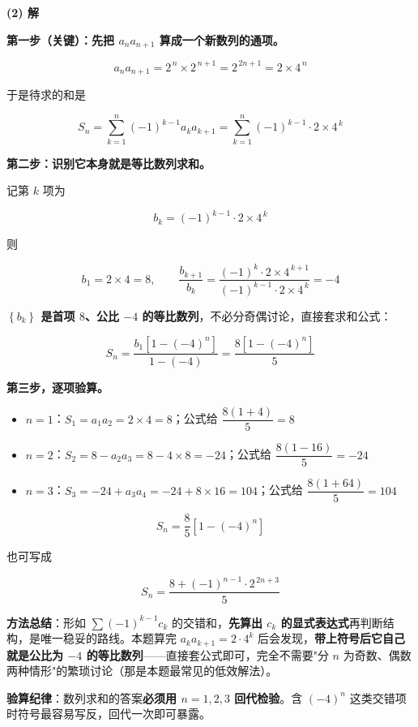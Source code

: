 \begin{answer}
\textbf{(2) 解}

\textbf{第一步（关键）：先把 $a_na_{n+1}$ 算成一个新数列的通项。}

\nopagebreak[4]
\[a_na_{n+1}=2^{\,n}\times2^{\,n+1}=2^{\,2n+1}=2\times4^{\,n}\]

于是待求的和是

\nopagebreak[4]
\[S_n=\sum_{k=1}^{n}(-1)^{k-1}a_ka_{k+1}=\sum_{k=1}^{n}(-1)^{k-1}\cdot2\times4^{\,k}\]

\textbf{第二步：识别它本身就是等比数列求和。}

记第 $k$ 项为

\nopagebreak[4]
\[b_k=(-1)^{k-1}\cdot2\times4^{\,k}\]

则

\nopagebreak[4]
\[b_1=2\times4=8,\qquad \frac{b_{k+1}}{b_k}=\frac{(-1)^{k}\cdot2\times4^{\,k+1}}{(-1)^{k-1}\cdot2\times4^{\,k}}=-4\]

\textbf{$\left\{b_k\right\}$ 是首项 $8$、公比 $-4$ 的等比数列}，不必分奇偶讨论，直接套求和公式：

\nopagebreak[4]
\[S_n=\frac{b_1\left[1-(-4)^{n}\right]}{1-(-4)}=\frac{8\left[1-(-4)^{n}\right]}5\]

\textbf{第三步，逐项验算。}

\begin{itemize}
\item $n=1$：$S_1=a_1a_2=2\times4=8$；公式给 $\dfrac{8(1+4)}5=8$ 
\item $n=2$：$S_2=8-a_2a_3=8-4\times8=-24$；公式给 $\dfrac{8(1-16)}5=-24$ 
\item $n=3$：$S_3=-24+a_3a_4=-24+8\times16=104$；公式给 $\dfrac{8(1+64)}5=104$ 
\end{itemize}

\nopagebreak[4]
\[\boxed{S_n=\frac85\left[1-(-4)^{n}\right]}\]

也可写成

\nopagebreak[4]
\[S_n=\frac{8+(-1)^{n-1}\cdot2^{\,2n+3}}5\]

\begin{gktip}
\textbf{方法总结}：形如 $\sum(-1)^{k-1}c_k$ 的交错和，\textbf{先算出 $c_k$ 的显式表达式}再判断结构，是唯一稳妥的路线。本题算完 $a_ka_{k+1}=2\cdot4^{k}$ 后会发现，\textbf{带上符号后它自己就是公比为 $-4$ 的等比数列}——直接套公式即可，完全不需要"分 $n$ 为奇数、偶数两种情形"的繁琐讨论（那是本题最常见的低效解法）。

\textbf{验算纪律}：数列求和的答案\textbf{必须用 $n=1,2,3$ 回代检验}。含 $(-4)^{n}$ 这类交错项时符号最容易写反，回代一次即可暴露。
\end{gktip}



\par\medskip

\end{answer}
